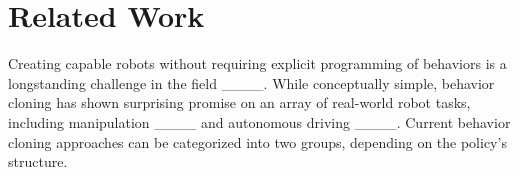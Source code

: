 \section{Related Work}
Creating capable robots without requiring explicit programming of behaviors is a longstanding challenge in the field ____.
While conceptually simple, behavior cloning has shown surprising promise on an array of real-world robot tasks, including manipulation ____ and autonomous driving ____. Current behavior cloning approaches can be categorized into two groups, depending on the policy's structure.

%